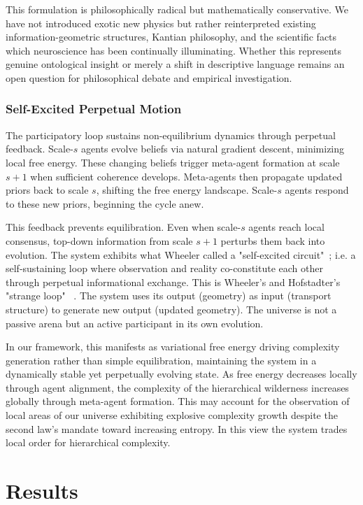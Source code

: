 \documentclass[11pt]{article}
\begin{document}
This formulation is philosophically radical but mathematically conservative. We have not introduced exotic new physics but rather reinterpreted existing information-geometric structures, Kantian philosophy, and the scientific facts which neuroscience has been continually illuminating. Whether this represents genuine ontological insight or merely a shift in descriptive language remains an open question for philosophical debate and empirical investigation.


\subsubsection{Self-Excited Perpetual Motion}

The participatory loop sustains non-equilibrium dynamics through perpetual feedback. Scale-$s$ agents evolve beliefs via natural gradient descent, minimizing local free energy. These changing beliefs trigger meta-agent formation at scale $s+1$ when sufficient coherence develops. Meta-agents then propagate updated priors back to scale $s$, shifting the free energy landscape. Scale-$s$ agents respond to these new priors, beginning the cycle anew.

This feedback prevents equilibration. Even when scale-$s$ agents reach local consensus, top-down information from scale $s+1$ perturbs them back into evolution. The system exhibits what Wheeler called a "self-excited circuit"~\cite{Wheeler1983}; i.e. a self-sustaining loop where observation and reality co-constitute each other through perpetual informational exchange. This is Wheeler's and Hofstadter's "strange loop" ~\cite{Hofstadter1979}. The system uses its output (geometry) as input (transport structure) to generate new output (updated geometry). The universe is not a passive arena but an active participant in its own evolution.

In our framework, this manifests as variational free energy driving complexity generation rather than simple equilibration, maintaining the system in a dynamically stable yet perpetually evolving state. As free energy decreases locally through agent alignment, the complexity of the hierarchical wilderness increases globally through meta-agent formation. This may account for the observation of local areas of our universe exhibiting explosive complexity growth despite the second law's mandate toward increasing entropy. In this view the system trades local order for hierarchical complexity.



\section{Results}
\end{document}
